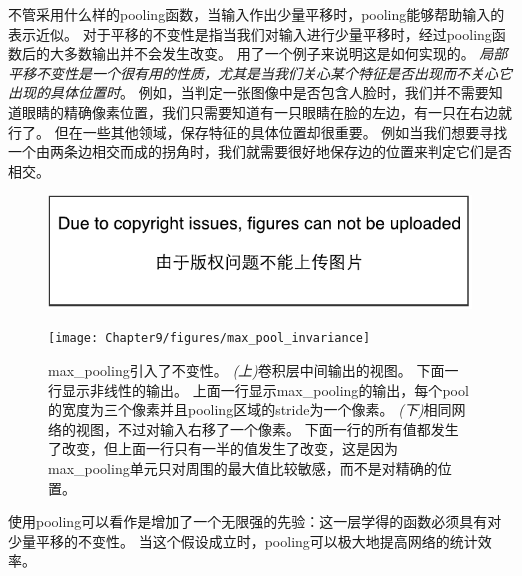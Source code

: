 不管采用什么样的\gls{pooling}函数，当输入作出少量平移时，\gls{pooling}能够帮助输入的表示近似。
对于平移的不变性是指当我们对输入进行少量平移时，经过\gls{pooling}函数后的大多数输出并不会发生改变。
用了一个例子来说明这是如何实现的。
\emph{局部平移不变性是一个很有用的性质，尤其是当我们关心某个特征是否出现而不关心它出现的具体位置时}。
例如，当判定一张图像中是否包含人脸时，我们并不需要知道眼睛的精确像素位置，我们只需要知道有一只眼睛在脸的左边，有一只在右边就行了。
但在一些其他领域，保存特征的具体位置却很重要。
例如当我们想要寻找一个由两条边相交而成的拐角时，我们就需要很好地保存边的位置来判定它们是否相交。
\begin{figure}[!htb]
\ifOpenSource
\centerline{\includegraphics{figure.pdf}}
\else
\centerline{\texttt{[image: Chapter9/figures/max\_pool\_invariance]}}
\fi
\caption{\gls{max_pooling}引入了不变性。
\emph{(上)}卷积层中间输出的视图。
下面一行显示非线性的输出。
上面一行显示\gls{max_pooling}的输出，每个\gls{pool}的宽度为三个像素并且\gls{pooling}区域的\gls{stride}为一个像素。
\emph{(下)}相同网络的视图，不过对输入右移了一个像素。
下面一行的所有值都发生了改变，但上面一行只有一半的值发生了改变，这是因为\gls{max_pooling}单元只对周围的最大值比较敏感，而不是对精确的位置。}
\label{fig:chap9_max_pool_invariance}
\end{figure}

 
使用\gls{pooling}可以看作是增加了一个无限强的先验：这一层学得的函数必须具有对少量平移的不变性。
当这个假设成立时，\gls{pooling}可以极大地提高网络的统计效率。

